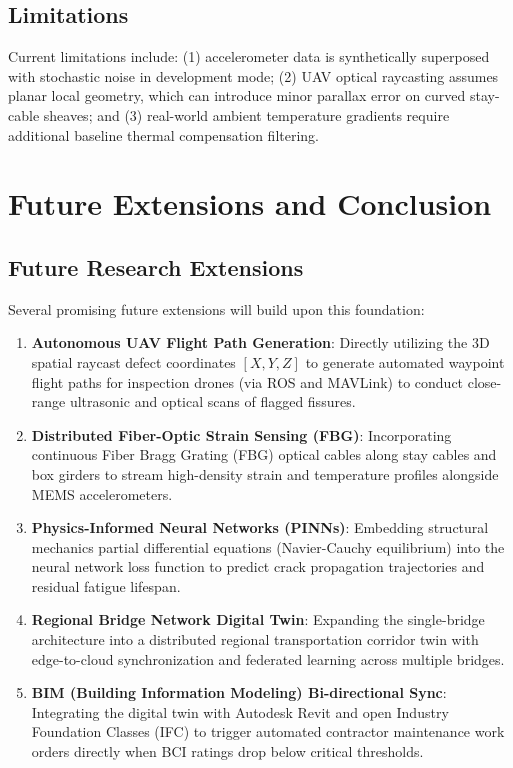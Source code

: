\documentclass[10pt, conference, letterpaper]{IEEEtran}
\begin{document}
\subsection{Limitations}
Current limitations include: (1) accelerometer data is synthetically superposed with stochastic noise in development mode; (2) UAV optical raycasting assumes planar local geometry, which can introduce minor parallax error on curved stay-cable sheaves; and (3) real-world ambient temperature gradients require additional baseline thermal compensation filtering.

\section{Future Extensions and Conclusion}

\subsection{Future Research Extensions}
Several promising future extensions will build upon this foundation:
\begin{enumerate}
    \item \textbf{Autonomous UAV Flight Path Generation}: Directly utilizing the 3D spatial raycast defect coordinates $[X, Y, Z]$ to generate automated waypoint flight paths for inspection drones (via ROS and MAVLink) to conduct close-range ultrasonic and optical scans of flagged fissures.
    \item \textbf{Distributed Fiber-Optic Strain Sensing (FBG)}: Incorporating continuous Fiber Bragg Grating (FBG) optical cables along stay cables and box girders to stream high-density strain and temperature profiles alongside MEMS accelerometers.
    \item \textbf{Physics-Informed Neural Networks (PINNs)}: Embedding structural mechanics partial differential equations (Navier-Cauchy equilibrium) into the neural network loss function to predict crack propagation trajectories and residual fatigue lifespan.
    \item \textbf{Regional Bridge Network Digital Twin}: Expanding the single-bridge architecture into a distributed regional transportation corridor twin with edge-to-cloud synchronization and federated learning across multiple bridges.
    \item \textbf{BIM (Building Information Modeling) Bi-directional Sync}: Integrating the digital twin with Autodesk Revit and open Industry Foundation Classes (IFC) to trigger automated contractor maintenance work orders directly when BCI ratings drop below critical thresholds.
\end{enumerate}
\end{document}
